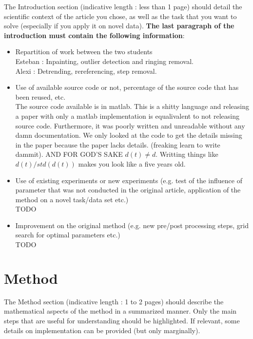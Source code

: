 \documentclass[11pt]{article}
\begin{document}
The Introduction section (indicative length : less than 1 page) should detail the scientific context of the article you chose, as well as the task that you want to solve (especially if you apply it on novel data). \textbf{The last paragraph of the introduction must contain the following information}:
\begin{itemize}
    \item Repartition of work between the two students\\
    
    Esteban : Inpainting, outlier detection and ringing removal.\\
    Alexi : Detrending, rereferencing, step removal.

    \item Use of available source code or not, percentage of the source code that has been reused, etc.\\
    
    The source code available is in matlab. This is a shitty language and releasing a paper with only a matlab implementation is equalivalent to not releasing source code. Furthermore, it was poorly written and unreadable without any damn documentation. We only looked at the code to get the details missing in the paper because the paper lacks details. (freaking learn to write dammit). AND FOR GOD'S SAKE \(d(t) \neq d\). Writting things like \(d(t)/std(d(t))\) makes you look like a five years old.

    \item Use of existing experiments or new experiments (e.g. test of the influence of parameter that was not conducted in the original article, application of the method on a novel task/data set etc.)\\
    
    TODO
    \item Improvement on the original method (e.g. new pre/post processing steps, grid search for optimal parameters etc.)\\
    
    TODO
\end{itemize}

\section{Method}

The Method section (indicative length : 1 to 2 pages) should describe the mathematical aspects of the method in a summarized manner. Only the main steps that are useful for understanding should be highlighted. If relevant, some details on implementation can be provided (but only marginally).\\
\end{document}
